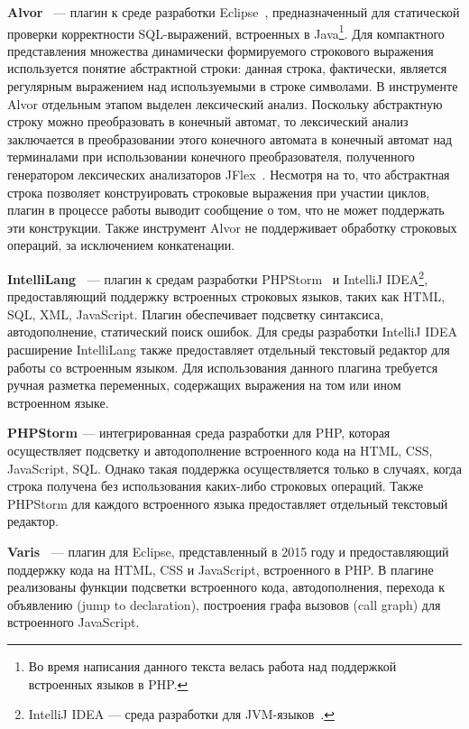 \textbf{Alvor}~\cite{Alvor1, Alvor2, AlvorUrl} {---} плагин к среде разработки Eclipse~\cite{Eclipse}, предназначенный для статической проверки корректности SQL-выражений, встроенных в Java\footnote{Во время написания данного текста велась работа над поддержкой встроенных языков в PHP.}. Для компактного представления множества динамически формируемого строкового выражения используется понятие абстрактной строки: данная строка, фактически, является регулярным выражением над используемыми в строке символами. В инструменте Alvor отдельным этапом выделен лексический анализ. Поскольку абстрактную строку можно преобразовать в конечный автомат, то лексический анализ заключается в преобразовании этого конечного автомата в конечный автомат над терминалами при  использовании конечного преобразователя, полученного генератором лексических анализаторов JFlex~\cite{JFlex}. Несмотря на то, что абстрактная строка позволяет конструировать строковые выражения при участии циклов, плагин в процессе работы выводит сообщение  о том, что не может поддержать эти конструкции. Также инструмент Alvor не поддерживает обработку строковых операций, за исключением конкатенации.

\textbf{IntelliLang~\cite{IntelliLang}} --- плагин к средам разработки PHPStorm~\cite{PHPStorm} и IntelliJ IDEA\footnote{IntelliJ IDEA --- среда разработки для JVM-языков~\cite{IDEA}.}, предоставляющий поддержку встроенных строковых языков, таких как HTML, SQL, XML, JavaScript. Плагин обеспечивает подсветку синтаксиса, автодополнение, статический поиск ошибок. Для среды разработки IntelliJ IDEA расширение IntelliLang также предоставляет отдельный текстовый редактор для работы со встроенным языком. Для использования данного плагина требуется ручная разметка переменных, содержащих выражения на том или ином встроенном языке.
    
\textbf{PHPStorm \cite{PHPStorm}} --- интегрированная среда разработки для PHP, которая осуществляет подсветку и автодополнение встроенного кода на HTML, CSS, JavaScript, SQL. Однако такая поддержка осуществляется только в случаях, когда строка получена без использования каких-либо строковых операций. Также PHPStorm для каждого встроенного языка предоставляет отдельный текстовый редактор. 

\textbf{Varis~\cite{Varis}} ---  плагин для Eclipse, представленный в 2015 году и предоставляющий поддержку кода на HTML, CSS и JavaScript, встроенного в PHP. В плагине реализованы функции  подсветки встроенного кода, автодополнения, перехода к объявлению (jump to declaration), построения графа вызовов (call graph) для встроенного JavaScript.

